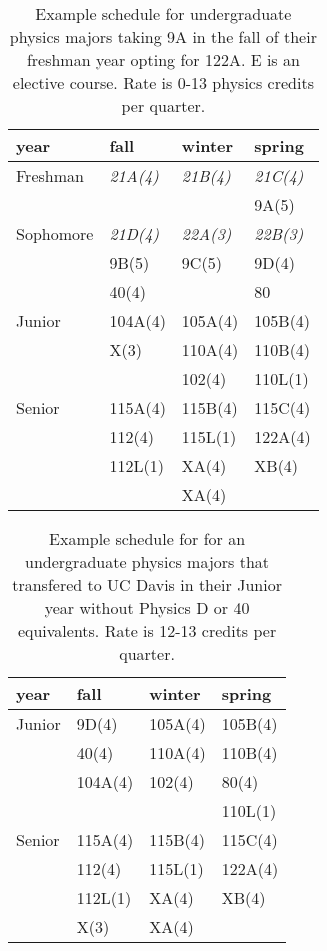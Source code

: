 \documentclass[12pt]{article}
\begin{document}
\begin{table}
\caption{Example schedule for undergraduate physics majors taking 9A in the fall of their  freshman year opting for 122A.  E is an elective course.  Rate is 0-13 physics credits per quarter.}
\label{tbl:proposed-nonhonors}
\begin{center}
\begin{tabular}{|l|l|l|l|}
\hline
year      & fall    & winter & spring \\
\hline
Freshman  & {\it 21A(4)}  & {\it 21B(4)}  & {\it 21C(4)}\\
          &               &               & 9A(5) \\
\hline
Sophomore & {\it 21D(4)}  & {\it 22A(3)}  & {\it 22B(3)}\\ 
          & 9B(5)         & 9C(5)         & 9D(4) \\
          & 40(4)         &             & 80 \\
\hline
Junior   & 104A(4)   & 105A(4)       & 105B(4) \\
         & X(3)      & 110A(4)       & 110B(4) \\         
         &           & 102(4)        & 110L(1) \\

\hline
Senior   & 115A(4)   & 115B(4)       & 115C(4) \\
         & 112(4)    & 115L(1)       & 122A(4) \\
         & 112L(1)   & XA(4)         & XB(4)  \\
		 &           & XA(4)         & \\
\hline  
\end{tabular}
\end{center}
\end{table}

\begin{table}

\caption{Example schedule for for an undergraduate physics majors that transfered to UC Davis in their Junior year without Physics D or 40 equivalents.  Rate is 12-13 credits per quarter.}
\label{tbl:proposed-transfers}
\begin{center}
\begin{tabular}{|l|l|l|l|}
\hline
year      & fall    & winter & spring \\
\hline
Junior   & 9D(4)     & 105A(4)       & 105B(4) \\
         & 40(4)     & 110A(4)       & 110B(4) \\         
         & 104A(4)   & 102(4)        & 80(4) \\
         &           &               & 110L(1) \\
\hline
Senior   & 115A(4)   & 115B(4)       & 115C(4) \\
         & 112(4)    & 115L(1)       & 122A(4) \\
         & 112L(1)   & XA(4)         & XB(4)  \\
		 & X(3)      & XA(4)         & \\
\hline 
\end{tabular}
\end{center}
\end{table}
\end{document}
